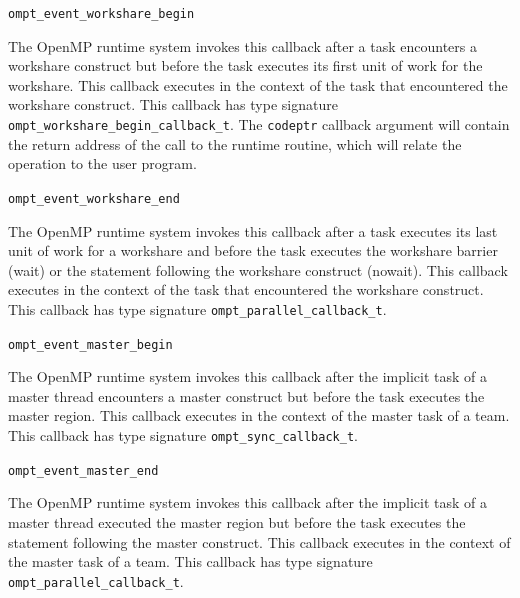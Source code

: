 \documentclass{article}
\newcommand{\descheader}[1]{{\needspace{3\baselineskip}\vspace{1em}\noindent \fbox{#1}}}
\begin{document}
\descheader{Workshares}

\begin{description}

\item \verb|ompt_event_workshare_begin|

The OpenMP runtime system invokes this callback after a task encounters a workshare construct but before the task executes its first unit of work for the workshare. This callback executes in the context of the task that encountered the workshare construct. This callback has type signature \verb|ompt_workshare_begin_callback_t|.
The \verb|codeptr| callback argument will contain the return address of the call to the runtime routine, which will relate the operation to the user program.

\item \verb|ompt_event_workshare_end|

The OpenMP runtime system invokes this callback after a task executes its last unit of work for a workshare and before the task executes the workshare barrier (wait) or the statement following the workshare construct (nowait). This callback executes in the context of the task that encountered the workshare construct.  This callback has type signature \verb|ompt_parallel_callback_t|.

\end{description}

\descheader{Master Blocks}

\begin{description}
 
\item \verb|ompt_event_master_begin|

  The OpenMP runtime system invokes this callback after the implicit task of a master thread encounters a master construct but
before the task
  executes the master region. This callback executes in the context of
  the master task of a team.
  This callback has type signature \verb|ompt_sync_callback_t|. 

\item \verb|ompt_event_master_end|

  The OpenMP runtime system invokes this callback after the implicit task of a master thread executed the master region 
 but before the task executes the statement
  following the master construct. This callback executes in the
  context of the master task of a  team.
  This callback has type signature \verb|ompt_parallel_callback_t|. 

\end{description}
\end{document}
